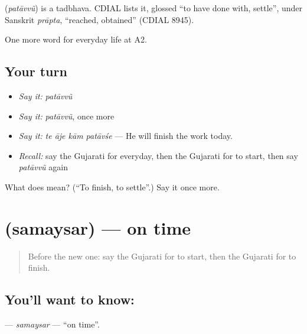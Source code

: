 \begin{cousinweb}
\textbf{} (\emph{patāvvũ}) is a tadbhava. CDIAL lists it, glossed \textquotedblleft{}to have done with, settle\textquotedblright{}, under Sanskrit \emph{prāpta}, \textquotedblleft{}reached, obtained\textquotedblright{} (CDIAL 8945).
\end{cousinweb}

\begin{grammarlens}[title={What you've built}]
One more word for everyday life at A2.
\end{grammarlens}

\subsection*{Your turn}
\begin{itemize}
\raggedright
  \item \emph{Say it:} \emph{patāvvũ}
  \item \emph{Say it:} \emph{patāvvũ}, once more
  \item \emph{Say it:} \emph{te āje kām patāvśe} — He will finish the work today.
  \item \emph{Recall:} say the Gujarati for everyday, then the Gujarati for to start, then say \emph{patāvvũ} again
\end{itemize}

\begin{tcolorbox}[breakable,colback=teal!4,colframe=teal!35!black,title={Before you move on}]
What does  mean? (\textquotedblleft{}To finish, to settle\textquotedblright{}.) Say it once more.
\end{tcolorbox}
\section[\texorpdfstring{\gu{સમયસર} (samaysar)}{સમયસર (samaysar)}]{ (samaysar) — on time}

\label{lesson:GU-C178-samaysar}



\begin{quote}
Before the new one: say the Gujarati for to start, then the Gujarati for to finish.
\end{quote}

\subsection*{You'll want to know: }
\textbf{} — \emph{samaysar} — \textquotedblleft{}on time\textquotedblright{}.

